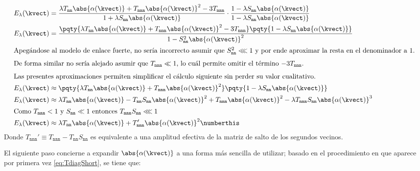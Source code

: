 \begin{align*}
E_\lambda(\kvect) &= \frac{\lambda T_{\mathtt{nn}}\abs{\alpha(\kvect)} + T_{\mathtt{nnn}}\abs{\alpha(\kvect)}^2 - 3T_{\mathtt{nnn}}}{1+\lambda S_{\mathtt{nn}}\abs{\alpha(\kvect)}} \cdot \frac{1-\lambda S_{\mathtt{nn}}\abs{\alpha(\kvect)}}{1-\lambda S_{\mathtt{nn}}\abs{\alpha(\kvect)}} \\
E_\lambda(\kvect) &= \frac{\pqty{\lambda T_{\mathtt{nn}}\abs{\alpha(\kvect)} + T_{\mathtt{nnn}}\abs{\alpha(\kvect)}^2 - 3T_{\mathtt{nnn}}}\pqty{1-\lambda S_{\mathtt{nn}}\abs{\alpha(\kvect)}}}{1- S_{\mathtt{nn}}^2\abs{\alpha(\kvect)}^2}\\
\intertext{Apegándose al modelo de enlace fuerte, no sería incorrecto asumir que $S_{\mathtt{nn}}^2\lll1$ y por ende aproximar la resta en el denominador a $ 1 $.}
\intertext{De forma similar no sería alejado asumir que $T_{\mathtt{nnn}}\ll1$, lo cuál permite omitir el término $- 3T_{\mathtt{nnn}}$.}
\intertext{Las presentes aproximaciones permiten simplificar el cálculo siguiente sin perder su valor cualitativo.}
E_\lambda(\kvect) &\approx \pqty{\lambda T_{\mathtt{nn}}\abs{\alpha(\kvect)} + {T_{\mathtt{nnn}}}\abs{\alpha(\kvect)}^2}\pqty{1-\lambda S_{\mathtt{nn}}\abs{\alpha(\kvect)}}\\
E_\lambda(\kvect) &\approx \lambda T_{\mathtt{nn}}\abs{\alpha(\kvect)} - T_{\mathtt{nn}}S_{\mathtt{nn}}\abs{\alpha(\kvect)}^2 + {T_{\mathtt{nnn}}}\abs{\alpha(\kvect)}^2 - \lambda{T_{\mathtt{nnn}}}S_{\mathtt{nn}}\abs{\alpha(\kvect)}^3\\
\intertext{Como $T_{\mathtt{nnn}}<1$ y $S_{\mathtt{nn}}\ll1$ entonces $T_{\mathtt{nnn}}S_{\mathtt{nn}}\lll1$}
E_\lambda(\kvect) &\approx \lambda T_{\mathtt{nn}}\abs{\alpha(\kvect)} + T_{\mathtt{nnn}}'\abs{\alpha(\kvect)}^2 \numberthis\label{eq:firstapprox}
\end{align*}
Donde $ T_{\mathtt{nnn}}' \equiv T_{\mathtt{nnn}} - T_{\mathtt{nn}}S_{\mathtt{nn}} $ 
es equivalente a una amplitud efectiva de la matriz de salto de los segundos vecinos.

El siguiente paso concierne a expandir $ \abs{\alpha(\kvect)} $ a una forma más 
sencilla de utilizar; basado en el procedimiento en que aparece por primera vez 
\eqref{eq:TdiagShort}, se tiene que:

